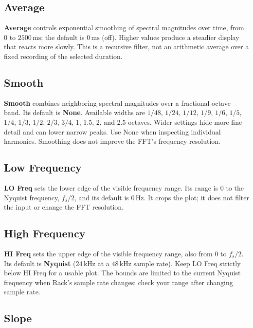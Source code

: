 \documentclass[12pt,letterpaper]{article}
\begin{document}
\subsection{Average}

\textbf{Average} controls exponential smoothing of spectral magnitudes over
time, from $0$ to $2500\,\mathrm{ms}$; the default is
\textbf{$0\,\mathrm{ms}$} (off). Higher values produce a steadier display
that reacts more slowly. This is a recursive filter, not an arithmetic
average over a fixed recording of the selected duration.

\subsection{Smooth}

\textbf{Smooth} combines neighboring spectral magnitudes over a
fractional-octave band. Its default is \textbf{None}. Available widths are
$1/48$, $1/24$, $1/12$, $1/9$, $1/6$, $1/5$, $1/4$, $1/3$, $1/2$, $2/3$,
$3/4$, 1, 1.5, 2, and 2.5 octaves. Wider settings hide more fine detail and
can lower narrow peaks. Use None when inspecting individual harmonics.
Smoothing does not improve the FFT's frequency resolution.

\subsection{Low Frequency}

\textbf{LO Freq} sets the lower edge of the visible frequency range. Its
range is $0$ to the Nyquist frequency, $f_s/2$, and its default is
\textbf{$0\,\mathrm{Hz}$}. It crops the plot; it does not filter the input
or change the FFT resolution.

\subsection{High Frequency}

\textbf{HI Freq} sets the upper edge of the visible frequency range, also
from $0$ to $f_s/2$. Its default is \textbf{Nyquist}
($24\,\mathrm{kHz}$ at a $48\,\mathrm{kHz}$ sample rate). Keep LO Freq
strictly below HI Freq for a usable plot. The bounds are limited to the
current Nyquist frequency when Rack's sample rate changes; check your range
after changing sample rate.

\subsection{Slope}
\end{document}
